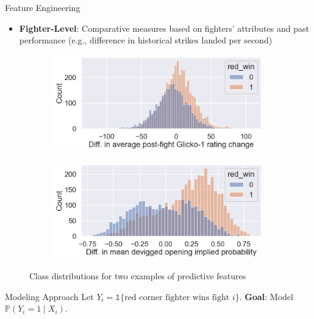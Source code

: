 \documentclass[final]{beamer}
\newlength{\colwidth}
\begin{document}
\begin{frame}[t]
\begin{columns}[t]
\begin{column}{\colwidth}
\begin{block}{Feature Engineering}
\begin{itemize}
        \item \textbf{Fighter-Level}: Comparative measures based on fighters' attributes and past performance (e.g., difference in historical strikes landed per second)
    \end{itemize}

    \begin{figure}
        \centering
        \captionsetup{justification=centering}
        \begin{subfigure}{.49\linewidth}
            \centering
            \includegraphics[width=\linewidth]{figures/glicko_1.png}
        \end{subfigure}
        \begin{subfigure}{.49\linewidth}
            \centering
            \includegraphics[width=\linewidth]{figures/opening_implied.png}
        \end{subfigure}
        \caption{Class distributions for two examples of predictive features}
    \end{figure}

  \end{block}

  \begin{block}{Modeling Approach}
    Let $Y_i = \mathds{1}\{\text{red corner fighter wins fight } i\}$. \textbf{Goal}: Model $\mathbb{P}(Y_i = 1 \mid X_i)$.
    

\end{block}
\end{column}
\end{columns}
\end{frame}
\end{document}
